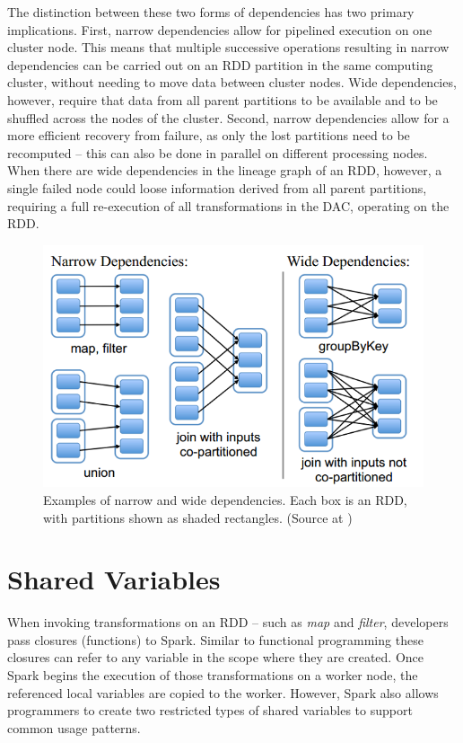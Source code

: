 \documentclass{l4proj}
\begin{document}
The distinction between these two forms of dependencies has two primary implications. First, narrow dependencies allow for pipelined execution on one cluster node. This means that multiple successive operations resulting in narrow dependencies can be carried out on an RDD partition in the same computing cluster, without needing to move data between cluster nodes. Wide dependencies, however, require that data from all parent partitions to be available and to be shuffled across the nodes of the cluster. Second, narrow dependencies allow for a more efficient recovery from failure, as only the lost partitions need to be recomputed -- this can also be done in parallel on different processing nodes. When there are wide dependencies in the lineage graph of an RDD, however, a single failed node could loose information derived from all parent partitions, requiring a full re-execution of all transformations in the DAC, operating on the RDD.

\begin{figure}[H]
\label{RDD dependencies}
\includegraphics[width=1.0\textwidth]{images/rdd_dependency}
\caption{Examples  of  narrow  and  wide  dependencies.  Each box is an RDD, with partitions shown as shaded rectangles. (Source at \cite{RDD})}
\end{figure}

\section{Shared Variables}

When invoking transformations on an RDD -- such as \textit{map} and \textit{filter}, developers pass closures (functions) to Spark. Similar to functional programming these closures can refer to any variable in the scope where they are created. Once Spark begins the execution of those transformations on a worker node, the referenced local variables are copied to the worker. However, Spark also allows programmers to create two restricted types of shared variables to support common usage patterns\cite{Spark}.
\end{document}
